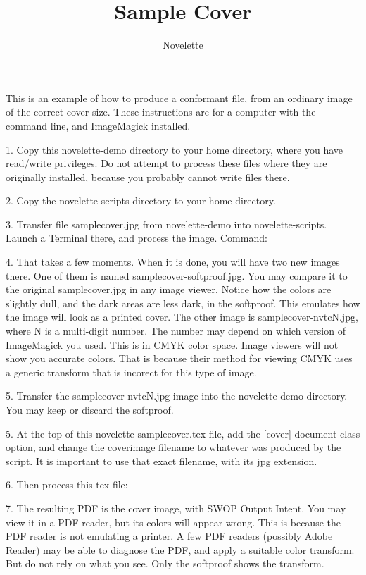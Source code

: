 \documentclass{novelette} %
\title{Sample Cover}
\author{Novelette}
\begin{document}
This is an example of how to produce a  conformant file,
from an ordinary image of the correct cover size. These instructions are
for a computer with the  command line, and ImageMagick installed.

1. Copy this novelette-demo directory to your home directory, where you
have read/write privileges. Do not attempt to process these files where
they are originally installed, because you probably cannot write files there.

2. Copy the novelette-scripts directory to your home directory.

3. Transfer file samplecover.jpg from novelette-demo into novelette-scripts.
Launch a Terminal there, and process the image. Command:


4. That takes a few moments. When it is done, you will have two new images
there. One of them is named samplecover-softproof.jpg. You may compare it
to the original samplecover.jpg in any image viewer. Notice how the colors
are slightly dull, and the dark areas are less dark, in the softproof.
This emulates how the image will look as a printed cover.
	The other image is samplecover-nvtcN.jpg, where N is a multi-digit number.
The number may depend on which version of ImageMagick you used. This is
in CMYK color space. Image viewers will not show you accurate colors.
That is because their method for viewing CMYK uses a generic transform that
is incorect for this type of image.

5. Transfer the samplecover-nvtcN.jpg image into the novelette-demo
directory. You may keep or discard the softproof.

5. At the top of this novelette-samplecover.tex file, add the [cover]
document class option, and change the coverimage filename to whatever was
produced by the script. It is important to use that exact filename, with its
jpg extension.

6. Then process this tex file:


\null

7. The resulting PDF is the cover image,  with SWOP Output
Intent. You may view it in a PDF reader, but its colors will appear wrong.
This is because the PDF reader is not emulating a printer.
A few PDF readers (possibly Adobe Reader) may be able to diagnose the PDF,
and apply a suitable color transform.
But do not rely on what you see. Only the softproof shows the transform.
\end{document}
